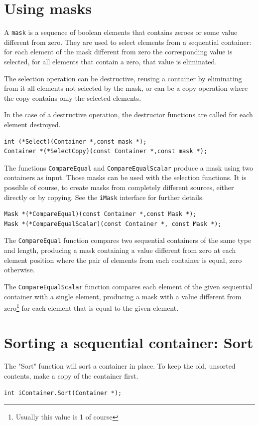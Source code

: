 \documentclass[12pt,a4paper,openany]{memoir} %
\begin{document}
\section{Using masks}
A \verb,mask, is a sequence of boolean elements that contains zeroes or some value different from zero. They are used to select elements from a sequential container: for each element of the mask different from zero the corresponding value is selected, for all elements that contain a zero, that value is eliminated.

The selection operation can be destructive, reusing a container by eliminating from it all elements not selected by the mask, or can be a copy operation where the copy contains only the selected elements.

In the case of a destructive operation, the destructor functions are called for each element destroyed.
\begin{verbatim}
int (*Select)(Container *,const mask *);
Container *(*SelectCopy)(const Container *,const mask *);
\end{verbatim}

The functions \verb,CompareEqual, and \verb,CompareEqualScalar, produce a mask using two containers as input. Those masks can be used with the selection functions. It is possible of course, to create masks from completely different sources, either directly or by copying. See the \verb,iMask, interface for further details.

\begin{verbatim}
Mask *(*CompareEqual)(const Container *,const Mask *);
Mask *(*CompareEqualScalar)(const Container *, const Mask *);
\end{verbatim}


The \verb,CompareEqual, function compares two sequential containers of the same type and length, producing a mask containing a value different from zero at each element position where the pair of elements from each container is equal, zero otherwise.

The \verb,CompareEqualScalar, function compares each element of the given sequential container with a single element, producing a mask with a value 
different from zero\footnote{Usually this value is 1 of course} for each element that is equal to the given element.
\section{Sorting a sequential container: Sort}
The "Sort" function will sort a container in place. To keep the old, unsorted contents, make a copy of the container first.
\begin{verbatim}
int iContainer.Sort(Container *);
\end{verbatim}
\end{document}
